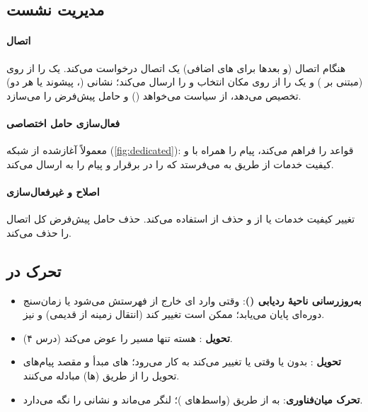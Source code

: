 \documentclass[11pt,a4paper]{article}
\begin{document}
\subsection{مدیریت نشست}
\paragraph{اتصال } هنگام اتصال (و بعدها برای های اضافی)  یک اتصال  درخواست
می‌کند.  یک  را از روی  (مبتنی بر ) و یک  را از روی مکان  انتخاب
و  را ارسال می‌کند؛  نشانی  (، پیشوند  یا هر دو) تخصیص
می‌دهد، از  سیاست می‌خواهد () و حامل پیش‌فرض را می‌سازد.
\paragraph{فعال‌سازی حامل اختصاصی} معمولاً آغازشده از شبکه (\cref{fig:dedicated}):  قواعد  را
فراهم می‌کند،  پیام  را همراه با  و کیفیت خدمات از طریق  به
 می‌فرستد که  را در  برقرار و پیام  
را به  ارسال می‌کند.
\paragraph{اصلاح و غیرفعال‌سازی} تغییر کیفیت خدمات یا  از  و حذف از
 استفاده می‌کند. حذف حامل پیش‌فرض کل اتصال  را حذف می‌کند.

\subsection{تحرک در }
\begin{itemize}
  \item \textbf{به‌روزرسانی ناحیهٔ ردیابی ()}: وقتی  وارد ای خارج از فهرستش می‌شود یا زمان‌سنج
        دوره‌ای  پایان می‌یابد؛  ممکن است تغییر کند (انتقال زمینه از  قدیمی) و  نیز.
  \item \textbf{تحویل }: هسته تنها مسیر را عوض می‌کند (درس ۴).
  \item \textbf{تحویل }: بدون  یا وقتی  یا  تغییر می‌کند به کار می‌رود؛ های
        مبدأ و مقصد پیام‌های تحویل را از طریق (ها) مبادله می‌کنند.
  \item \textbf{تحرک میان‌فناوری}: به  از طریق  (واسط‌های )؛  لنگر می‌ماند و
         نشانی  را نگه می‌دارد.
\end{itemize}
\end{document}
